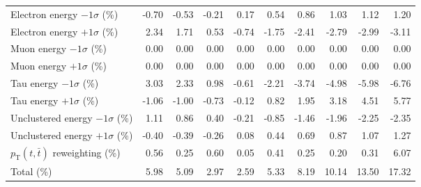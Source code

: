 \begin{table}[htbp]
{\begin{tabular}{lrrrrrrrrr}
Electron energy $-1\sigma$ (\%) & -0.70 & -0.53 & -0.21 & 0.17 & 0.54 & 0.86 & 1.03 & 1.12 & 1.20 \\ 
Electron energy $+1\sigma$ (\%) & 2.34 & 1.71 & 0.53 & -0.74 & -1.75 & -2.41 & -2.79 & -2.99 & -3.11 \\ 
Muon energy $-1\sigma$ (\%) & 0.00 & 0.00 & 0.00 & 0.00 & 0.00 & 0.00 & 0.00 & 0.00 & 0.00 \\ 
Muon energy $+1\sigma$ (\%) & 0.00 & 0.00 & 0.00 & 0.00 & 0.00 & 0.00 & 0.00 & 0.00 & 0.00 \\ 
Tau energy $-1\sigma$ (\%) & 3.03 & 2.33 & 0.98 & -0.61 & -2.21 & -3.74 & -4.98 & -5.98 & -6.76 \\ 
Tau energy $+1\sigma$ (\%) & -1.06 & -1.00 & -0.73 & -0.12 & 0.82 & 1.95 & 3.18 & 4.51 & 5.77 \\ 
Unclustered energy $-1\sigma$ (\%) & 1.11 & 0.86 & 0.40 & -0.21 & -0.85 & -1.46 & -1.96 & -2.25 & -2.35 \\ 
Unclustered energy $+1\sigma$ (\%) & -0.40 & -0.39 & -0.26 & 0.08 & 0.44 & 0.69 & 0.87 & 1.07 & 1.27 \\ 
$p_\mathrm{T}(t,\bar{t})$ reweighting (\%) & 0.56 & 0.25 & 0.60 & 0.05 & 0.41 & 0.25 & 0.20 & 0.31 & 6.07 \\ 
\hline 
Total (\%) & 5.98  & 5.09  & 2.97  & 2.59  & 5.33  & 8.19  & 10.14  & 13.50  & 17.32 \\ 
\hline 
\end{tabular}
}
\end{table}
